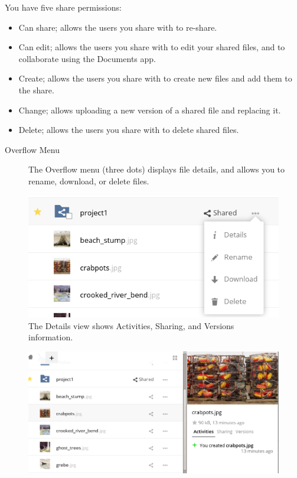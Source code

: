 \documentclass[letterpaper,10pt,english]{sphinxmanual}
\begin{document}
You have five share permissions:
\begin{itemize}
\item {} 
Can share; allows the users you share with to re-share.

\item {} 
Can edit; allows the users you share with to edit your shared files, and to collaborate using the Documents app.

\item {} 
Create; allows the users you share with to create new files and add them to the share.

\item {} 
Change; allows uploading a new version of a shared file and replacing it.

\item {} 
Delete; allows the users you share with to delete shared files.

\end{itemize}
\begin{description}
\item[{Overflow Menu}] \leavevmode
The Overflow menu (three dots) displays file details, and allows you to
rename, download, or delete files.

\end{description}
\begin{figure}[htbp]
\centering
\capstart

\includegraphics{files_page-3.png}
\caption{The Details view shows Activities, Sharing, and Versions information.}\end{figure}
\begin{figure}[htbp]
\centering

\includegraphics{files_page-4.png}
\end{figure}
\end{document}
